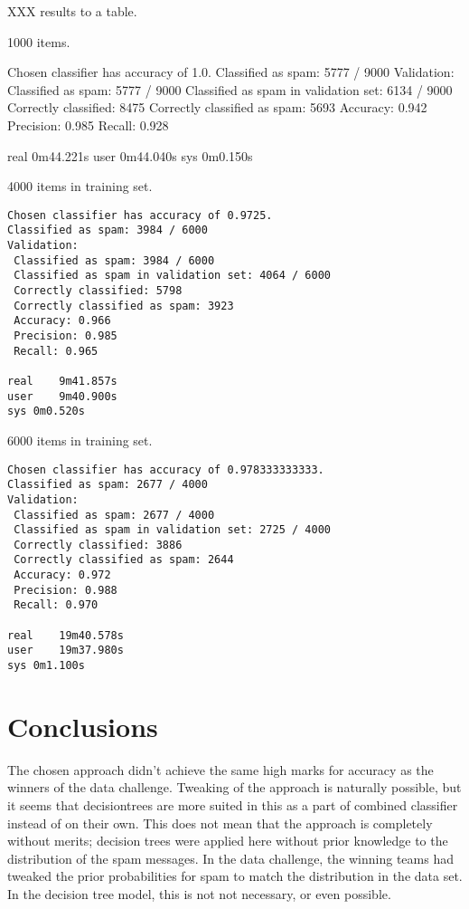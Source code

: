 \documentclass[a4paper,10pt]{article}
\begin{document}
XXX results to a table.

1000 items.

\begin{outputlog}
Chosen classifier has accuracy of 1.0.
Classified as spam: 5777 / 9000
Validation:
 Classified as spam: 5777 / 9000
 Classified as spam in validation set: 6134 / 9000
 Correctly classified: 8475
 Correctly classified as spam: 5693
 Accuracy: 0.942
 Precision: 0.985
 Recall: 0.928

real	0m44.221s
user	0m44.040s
sys	0m0.150s
\end{outputlog}

4000 items in training set.

\begin{verbatim}
Chosen classifier has accuracy of 0.9725.
Classified as spam: 3984 / 6000
Validation:
 Classified as spam: 3984 / 6000
 Classified as spam in validation set: 4064 / 6000
 Correctly classified: 5798
 Correctly classified as spam: 3923
 Accuracy: 0.966
 Precision: 0.985
 Recall: 0.965

real	9m41.857s
user	9m40.900s
sys	0m0.520s
\end{verbatim}

6000 items in training set.

\begin{verbatim}
Chosen classifier has accuracy of 0.978333333333.
Classified as spam: 2677 / 4000
Validation:
 Classified as spam: 2677 / 4000
 Classified as spam in validation set: 2725 / 4000
 Correctly classified: 3886
 Correctly classified as spam: 2644
 Accuracy: 0.972
 Precision: 0.988
 Recall: 0.970

real	19m40.578s
user	19m37.980s
sys	0m1.100s
\end{verbatim}

\section{Conclusions}

The chosen approach didn't achieve the same high marks for accuracy as
the winners of the data challenge.  Tweaking of the approach is
naturally possible, but it seems that decisiontrees are more suited in
this as a part of combined classifier instead of on their own.  This
does not mean that the approach is completely without merits; decision
trees were applied here without prior knowledge to the distribution of
the spam messages.  In the data challenge, the winning teams had tweaked
the prior probabilities for spam to match the distribution in the data
set.  In the decision tree model, this is not not necessary, or even
possible.
\end{document}
